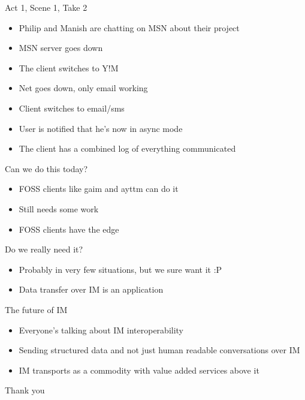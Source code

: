 \documentclass{beamer}
\begin{document}
\begin{frame}{Act 1, Scene 1, Take 2}
   \begin{itemize}
   \item<1-> Philip and Manish are chatting on MSN about their project
   \item<2-> MSN server goes down
   \item<3-> The client switches to Y!M
   \item<4-> Net goes down, only email working
   \item<5-> Client switches to email/sms
   \item<6-> User is notified that he's now in async mode
   \item<7-> The client has a combined log of everything communicated
   \end{itemize}
\end{frame}


\begin{frame}{Can we do this today?}
   \begin{itemize}
   \item FOSS clients like gaim and ayttm can do it
   \item Still needs some work
   \item FOSS clients have the edge
   \end{itemize}
\end{frame}


\begin{frame}{Do we really need it?}
   \begin{itemize}
   \item Probably in very few situations, but we sure want it :P
   \item Data transfer over IM is an application
   \end{itemize}
\end{frame}


\begin{frame}{The future of IM}
   \begin{itemize}
   \item Everyone's talking about IM interoperability
   \item Sending structured data and not just human readable conversations over IM
   \item IM transports as a commodity with value added services above it
   \end{itemize}
\end{frame}

\begin{frame}
\begin{center}
Thank you

\href{http://tech.bluesmoon.info/2004/09/fallback-messaging.html}{}
\end{center}
\end{frame}
\end{document}
